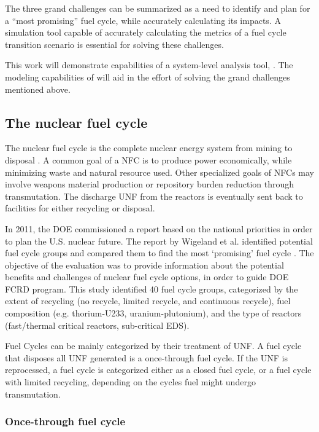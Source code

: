 The three grand challenges can be summarized as a need to
identify and plan for a ``most promising'' fuel cycle, while
accurately calculating its impacts. 
A simulation tool capable of accurately calculating the metrics
of a fuel cycle transition scenario is essential for solving these challenges.

This work will demonstrate capabilities of a system-level
analysis tool, \Cyclus. The modeling capabilities of \Cyclus 
will aid in the effort of solving
the grand challenges mentioned above.

\subsection{The nuclear fuel cycle}
The nuclear fuel cycle is the complete nuclear energy
system from mining to disposal \cite{tsoulfanidis_nuclear_2013}.
A common goal of
a \gls{NFC} is to produce power economically, while minimizing
waste and natural resource used. Other specialized goals of \gls{NFC}s may involve
weapons material production or repository burden reduction through transmutation.
The discharge \gls{UNF} from the reactors is eventually sent back to facilities for
either recycling or disposal.

In 2011, the \gls{DOE} commissioned a report based on the national priorities
in order to plan the U.S. nuclear future.
The report by Wigeland et al. identified potential fuel cycle groups and compared them
to find the most `promising' fuel cycle \cite{wigeland_nuclear_2014}.
The objective of the evaluation was to provide information about the
potential benefits and challenges of nuclear fuel cycle options, in order to
guide \gls{DOE} \gls{FCRD} program.
This study identified 40 fuel cycle groups, categorized by the extent of recycling
(no recycle, limited recycle, and continuous recycle), fuel composition
(e.g. thorium-U233, uranium-plutonium), and the type of reactors (fast/thermal critical
reactors, sub-critical \gls{EDS}).

Fuel Cycles can be mainly categorized by their treatment of \gls{UNF}. A
fuel cycle that disposes all \gls{UNF} generated is a once-through fuel cycle.
If the \gls{UNF} is reprocessed, a fuel cycle is categorized either as a
closed fuel cycle, or a fuel cycle with limited recycling, depending on
the cycles fuel might undergo transmutation. 

\subsubsection{Once-through fuel cycle}

